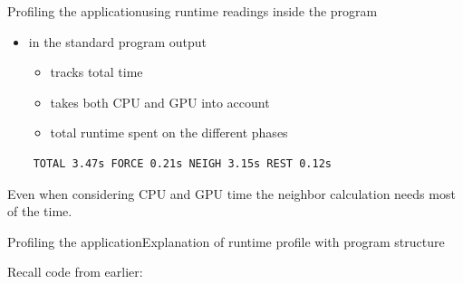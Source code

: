 \documentclass[ignorenonframetext,aspectratio=169]{beamer}
\newenvironment{Shaded}{}{}
\newcommand{\ControlFlowTok}[1]{\textcolor[rgb]{0.00,0.44,0.13}{\textbf{#1}}}
\newcommand{\DecValTok}[1]{\textcolor[rgb]{0.25,0.63,0.44}{#1}}
\newcommand{\FloatTok}[1]{\textcolor[rgb]{0.25,0.63,0.44}{#1}}
\newcommand{\KeywordTok}[1]{\textcolor[rgb]{0.00,0.44,0.13}{\textbf{#1}}}
\newcommand{\NormalTok}[1]{#1}
\newcommand{\OperatorTok}[1]{\textcolor[rgb]{0.40,0.40,0.40}{#1}}
\begin{document}
\begin{frame}[fragile]{Profiling the application}{using runtime readings inside the program}
\vspace{-4\baselineskip}
    \begin{itemize}
    	\item in the standard program output
    	\begin{itemize}
    		\item tracks total time
    		\item takes both CPU and GPU into account
    		\item total runtime spent on the different phases
    	\end{itemize}
    \end{itemize}
    
    \begin{verbatim}
    TOTAL 3.47s FORCE 0.21s NEIGH 3.15s REST 0.12s
    \end{verbatim}
    
    Even when considering CPU and GPU time the neighbor calculation needs most of the time.
\end{frame}

\begin{frame}[fragile]{Profiling the application}{Explanation of runtime profile with program structure}

    Recall code from earlier:
    \begin{scriptsize}
        \begin{Shaded}
        \end{Shaded}
    \end{scriptsize}
\end{frame}
\end{document}
